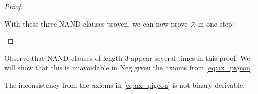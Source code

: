 \begin{proof}
\begin{figure}[!h]
  \centering
  \begin{prooftree*}[separation=0.8em, rule margin=1ex]
  \end{prooftree*}
  \caption{}
  \label{fig:proof_34}
\end{figure}
\FloatBarrier
With these three NAND-clauses proven, we can now prove $\varnothing$ in one step:\par
\begin{figure}[!h]
  \centering
  \begin{prooftree*}[rule margin=1ex]
  \end{prooftree*}
  \caption{}
  \label{fig:proof_empty}
\end{figure}
\end{proof}
Observe that NAND-clauses of length 3 appear several times in this proof.
We will show that this is unavoidable in Neg given the axioms from \ref{eq:ax_pigeon}.
\begin{lemma}
  The inconsistency from the axioms in \ref{eq:ax_pigeon} is not binary-derivable.
\end{lemma}
